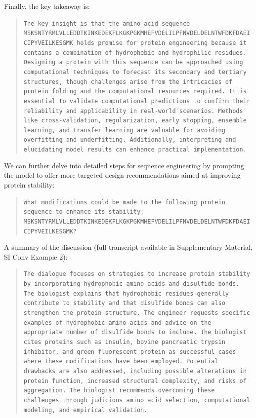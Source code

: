 Finally, the key takeaway is:

\begin{quote}
\small\texttt{The key insight is that the amino acid sequence MSKSNTYRMLVLLEDDTKINKEDEKFLKGKPGKMHEFVDELILPFNVDELDELNTWFDKFDAEICIPYVEILKESGMK holds promise for protein engineering because it contains a combination of hydrophobic and hydrophilic residues. Designing a protein with this sequence can be approached using computational techniques to forecast its secondary and tertiary structures, though challenges arise from the intricacies of protein folding and the computational resources required. It is essential to validate computational predictions to confirm their reliability and applicability in real-world scenarios. Methods like cross-validation, regularization, early stopping, ensemble learning, and transfer learning are valuable for avoiding overfitting and underfitting. Additionally, interpreting and elucidating model results can enhance practical implementation.}
\end{quote}

We can further delve into detailed steps for sequence engineering by prompting the model to offer more targeted design recommendations aimed at improving protein stability:

\begin{quote}
\small\texttt{What modifications could be made to the following protein sequence to enhance its stability: MSKSNTYRMLVLLEDDTKINKEDEKFLKGKPGKMHEFVDELILPFNVDELDELNTWFDKFDAEICIPYVEILKESGMK?}
\end{quote}

A summary of the discussion (full transcript available in Supplementary Material, SI Conv Example 2):

\begin{quote}
\small\texttt{The dialogue focuses on strategies to increase protein stability by incorporating hydrophobic amino acids and disulfide bonds. The biologist explains that hydrophobic residues generally contribute to stability and that disulfide bonds can also strengthen the protein structure. The engineer requests specific examples of hydrophobic amino acids and advice on the appropriate number of disulfide bonds to include. The biologist cites proteins such as insulin, bovine pancreatic trypsin inhibitor, and green fluorescent protein as successful cases where these modifications have been employed. Potential drawbacks are also addressed, including possible alterations in protein function, increased structural complexity, and risks of aggregation. The biologist recommends overcoming these challenges through judicious amino acid selection, computational modeling, and empirical validation.}
\end{quote}

